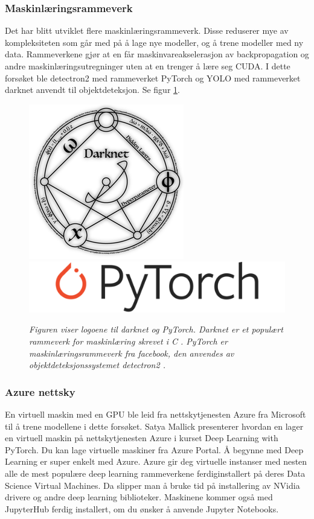 \subsubsection{Maskinlæringsrammeverk}

Det har blitt utviklet flere maskinlæringsrammeverk. Disse reduserer mye av kompleksiteten som går med på å lage nye modeller, og å trene modeller med ny data. Rammeverkene gjør at en får maskinvareakselerasjon av backpropagation og andre maskinlæringsutregninger uten at en trenger å lære seg CUDA. I dette forsøket ble detectron2 med rammeverket PyTorch og YOLO med rammeverket darknet anvendt til objektdeteksjon. Se figur \ref{fig:dl_libs}.

\begin{figure} 
\begin{center} 
\includegraphics[scale=0.30]{figures/darknet-logo}
\includegraphics[scale=0.30]{figures/Pytorch_logo}
\caption{\small \sl Figuren viser logoene til darknet og PyTorch. Darknet er et populært rammeverk for maskinlæring skrevet i C \cite{Redmon 2016}. PyTorch er maskinlæringsrammeverk fra facebook, den anvendes av objektdeteksjonssystemet detectron2 \cite{Wu m.fl. 2020}. \label{fig:dl_libs}}
\end{center} 
\end{figure} 

\subsubsection{Azure nettsky}

En virtuell maskin med en GPU ble leid fra nettskytjenesten Azure fra Microsoft til å trene modellene i dette forsøket. Satya Mallick presenterer hvordan en lager en virtuell maskin på nettskytjenesten Azure i kurset Deep Learning with PyTorch. Du kan lage virtuelle maskiner fra Azure Portal. Å begynne med Deep Learning er super enkelt med Azure. Azure gir deg virtuelle instanser med nesten alle de mest populære deep learning rammeverkene ferdiginstallert på deres Data Science Virtual Machines. Da slipper man å bruke tid på installering av NVidia drivere og andre deep learning biblioteker. Maskinene kommer også med JupyterHub ferdig installert, om du ønsker å anvende Jupyter Notebooks. \cite{Mallick m.fl. 2020}

